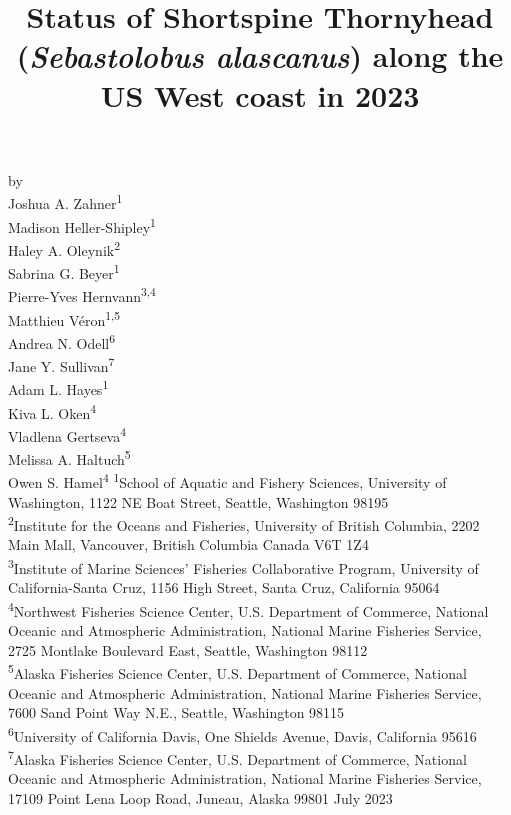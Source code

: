 \documentclass[11pt,
  english,
  letterpaper,
]{article}
\date{}
\newcommand{\trTitle}{Status of Shortspine Thornyhead (\emph{Sebastolobus alascanus}) along the US West coast in 2023}
\newcommand{\trYear}{2023}
\newcommand{\trMonth}{July}
\begin{document}

\renewcommand*{\thefootnote}{\fnsymbol{footnote}}

\small
\thispagestyle{empty}
\noindent
\begin{center}
\title{Status of Shortspine Thornyhead (\emph{Sebastolobus alascanus}) along the US West coast in 2023}
\vspace{1.5cm}
{\Large\textbf{}}
\vfill
by\\
Joshua A. Zahner\textsuperscript{1}\\
Madison Heller-Shipley\textsuperscript{1}\\
Haley A. Oleynik\textsuperscript{2}\\
Sabrina G. Beyer\textsuperscript{1}\\
Pierre-Yves Hernvann\textsuperscript{3,4}\\
Matthieu Véron\textsuperscript{1,5}\\
Andrea N. Odell\textsuperscript{6}\\
Jane Y. Sullivan\textsuperscript{7}\\
Adam L. Hayes\textsuperscript{1}\\
Kiva L. Oken\textsuperscript{4}\\
Vladlena Gertseva\textsuperscript{4}\\
Melissa A. Haltuch\textsuperscript{5}\\
Owen S. Hamel\textsuperscript{4}\vfill
\textsuperscript{1}School of Aquatic and Fishery Sciences, University of Washington, 1122 NE Boat Street, Seattle, Washington 98195\\
\textsuperscript{2}Institute for the Oceans and Fisheries, University of British Columbia, 2202 Main Mall, Vancouver, British Columbia Canada V6T 1Z4\\
\textsuperscript{3}Institute of Marine Sciences' Fisheries Collaborative Program, University of California-Santa Cruz, 1156 High Street, Santa Cruz, California 95064\\
\textsuperscript{4}Northwest Fisheries Science Center, U.S. Department of Commerce, National Oceanic and Atmospheric Administration, National Marine Fisheries Service, 2725 Montlake Boulevard East, Seattle, Washington 98112\\
\textsuperscript{5}Alaska Fisheries Science Center, U.S. Department of Commerce, National Oceanic and Atmospheric Administration, National Marine Fisheries Service, 7600 Sand Point Way N.E., Seattle, Washington 98115\\
\textsuperscript{6}University of California Davis, One Shields Avenue, Davis, California 95616\\
\textsuperscript{7}Alaska Fisheries Science Center, U.S. Department of Commerce, National Oceanic and Atmospheric Administration, National Marine Fisheries Service, 17109 Point Lena Loop Road, Juneau, Alaska 99801\vfill
\trMonth{} \trYear{}
\end{center}
\clearpage
\end{document}
